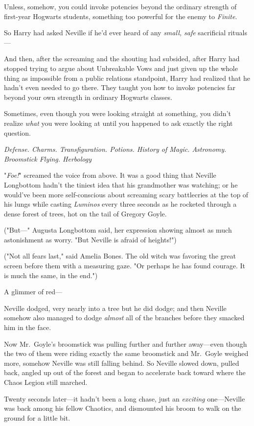 Unless, somehow, you could invoke potencies beyond the ordinary strength of
first-year Hogwarts students, something too powerful for the enemy to
\emph{Finite}.

So Harry had asked Neville if he'd ever heard of any \emph{small, safe}
sacrificial rituals—

And then, after the screaming and the shouting had subsided, after Harry had
stopped trying to argue about Unbreakable Vows and just given up the whole
thing as impossible from a public relations standpoint, Harry had realized that
he hadn't even needed to go there. They taught you how to invoke potencies far
beyond your own strength in ordinary Hogwarts classes.

Sometimes, even though you were looking straight at something, you didn't
realize \emph{what} you were looking at until you happened to ask exactly the
right question.

\emph{Defense. Charms. Transfiguration. Potions. History of Magic. Astronomy.
Broomstick Flying. Herbology{\el}}

"\emph{Foe!}" screamed the voice from above.
\sbreak
It was a good thing that Neville Longbottom hadn't the tiniest idea that his
grandmother was watching; or he would've been more self-conscious about
screaming scary battlecries at the top of his lungs while casting
\emph{Luminos} every three seconds as he rocketed through a dense forest of
trees, hot on the tail of Gregory Goyle.

("But—" Augusta Longbottom said, her expression showing almost as much
astonishment as worry. "But Neville is afraid of heights!")

("Not all fears last," said Amelia Bones. The old witch was favoring the great
screen before them with a measuring gaze. "Or perhaps he has found courage. It
is much the same, in the end.")

A glimmer of red—

Neville dodged, very nearly into a tree but he did dodge; and then Neville
somehow also managed to dodge \emph{almost} all of the branches before they
smacked him in the face.

Now Mr.~Goyle's broomstick was pulling further and further away—even though
the two of them were riding exactly the same broomstick and Mr.~Goyle weighed
more, somehow Neville was still falling behind. So Neville slowed down, pulled
back, angled up out of the forest and began to accelerate back toward where the
Chaos Legion still marched.

Twenty seconds later—it hadn't been a long chase, just an \emph{exciting}
one—Neville was back among his fellow Chaotics, and dismounted his broom to
walk on the ground for a little bit.


